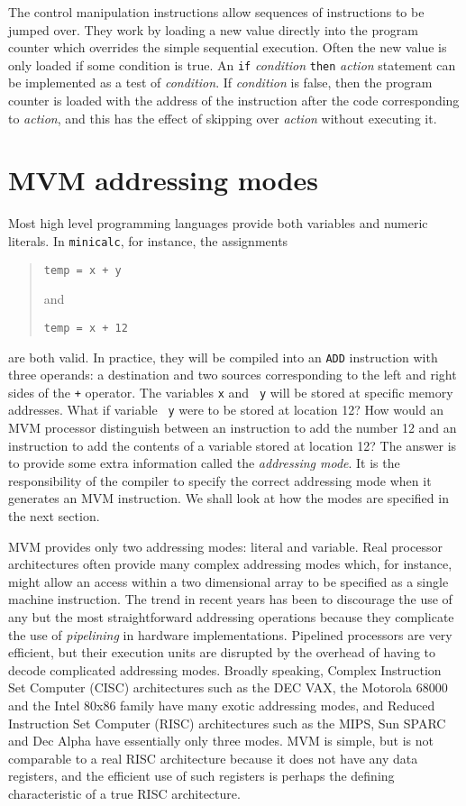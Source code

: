The control manipulation instructions allow sequences of instructions to
be jumped over. They work by loading a new value directly into the
program counter which overrides the simple sequential execution. Often 
the new value is only loaded if some condition is true. An {\tt if} {\em
condition} {\tt then} {\em action} statement can be implemented as a
test of {\em condition}. If {\em condition} is false, then the program counter
is loaded with the address of the instruction after the code
corresponding to {\em action}, and this has the effect of skipping over
{\em action} without executing it.

\section{MVM addressing modes}
\label{addressing:modes}

Most high level programming languages provide both variables and numeric
literals. In {\tt minicalc}, for instance, the assignments 
\begin{quote}
{\tt temp = x + y}

and

{\tt temp = x + 12}
\end{quote}
are both valid. In practice, they
will be compiled into an {\tt ADD} instruction with three
operands: a destination and two sources corresponding to the  left and
right sides of the {\tt +} operator. The variables {\tt x} and {\tt
y}  will be stored at specific memory addresses. What if variable {\tt
y} were to be stored at location 12? How would an MVM processor
distinguish between an instruction to add the number 12 and an
instruction to add the contents of a variable stored at location 12? The
answer is to provide some extra information called the {\em addressing
mode}. It is the
responsibility of the compiler to specify the correct addressing mode
when it generates an MVM instruction. We shall look at how the modes are
specified in the next section.

MVM provides only two addressing modes: literal and variable. Real
processor architectures often provide many complex addressing modes
which, for instance, might allow an access within a two dimensional
array to be specified as a single machine instruction. The trend in
recent years has been to discourage the use of any but the most
straightforward addressing operations because they complicate the use of
{\em pipelining} in hardware implementations. Pipelined processors are
very efficient, but their execution units are disrupted by the overhead
of having to decode complicated addressing modes. Broadly speaking,
Complex Instruction Set Computer (CISC) architectures such as the DEC
VAX, the Motorola 68000 and the Intel 80x86 family have many exotic
addressing modes, and Reduced Instruction Set Computer (RISC)
architectures such as the MIPS, Sun SPARC and Dec Alpha have essentially
only three modes.  MVM is simple, but is not comparable to a real RISC
architecture because it does not have any data registers, and the
efficient use of such registers is perhaps the defining characteristic
of a true RISC architecture.

